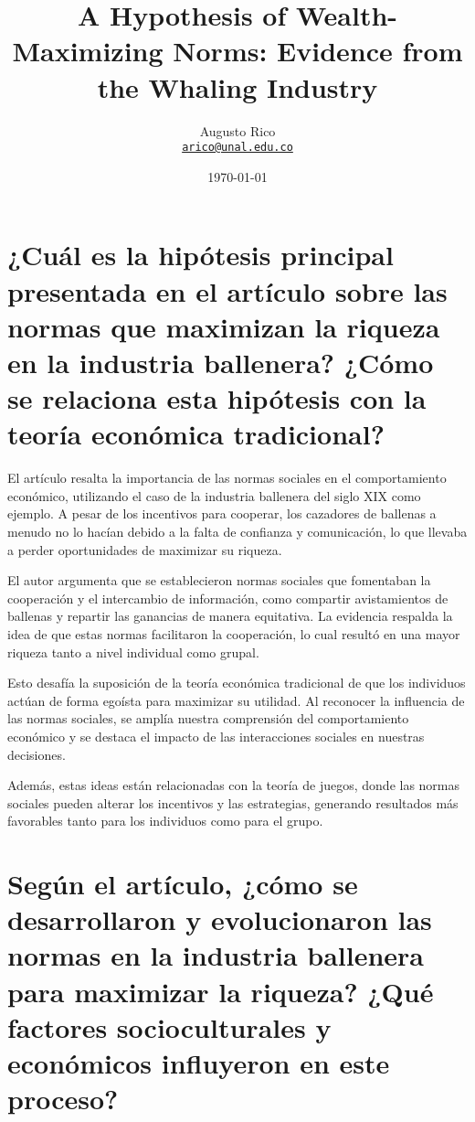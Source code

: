 \documentclass[11pt]{article}
\title{A Hypothesis of Wealth-Maximizing Norms: Evidence from the Whaling Industry
}
\author{Augusto Rico\\
    \href{mailto:arico@unal.edu.co}{\texttt{arico@unal.edu.co}}}
\date{\today}
\begin{document}
\maketitle
\section{¿Cuál es la hipótesis principal presentada en el artículo sobre las normas que maximizan la riqueza en la industria ballenera? ¿Cómo se relaciona esta hipótesis con la teoría económica tradicional?}
\begin{flushleft}
    El artículo resalta la importancia de las normas sociales en el comportamiento económico, utilizando el caso de la industria ballenera del siglo XIX como ejemplo. A pesar de los incentivos para cooperar, los cazadores de ballenas a menudo no lo hacían debido a la falta de confianza y comunicación, lo que llevaba a perder oportunidades de maximizar su riqueza.

El autor argumenta que se establecieron normas sociales que fomentaban la cooperación y el intercambio de información, como compartir avistamientos de ballenas y repartir las ganancias de manera equitativa. La evidencia respalda la idea de que estas normas facilitaron la cooperación, lo cual resultó en una mayor riqueza tanto a nivel individual como grupal.

Esto desafía la suposición de la teoría económica tradicional de que los individuos actúan de forma egoísta para maximizar su utilidad. Al reconocer la influencia de las normas sociales, se amplía nuestra comprensión del comportamiento económico y se destaca el impacto de las interacciones sociales en nuestras decisiones.

Además, estas ideas están relacionadas con la teoría de juegos, donde las normas sociales pueden alterar los incentivos y las estrategias, generando resultados más favorables tanto para los individuos como para el grupo.
\end{flushleft}

\section{Según el artículo, ¿cómo se desarrollaron y evolucionaron las normas en la industria ballenera para maximizar la riqueza? ¿Qué factores socioculturales y económicos influyeron en este proceso?}
\end{document}
